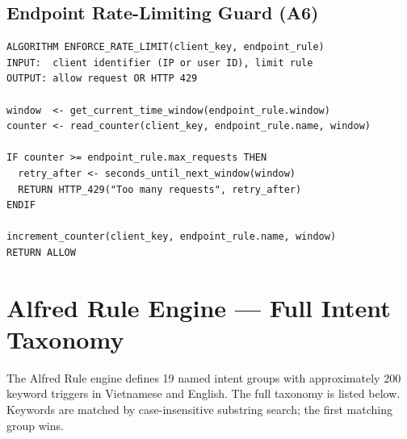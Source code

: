 \subsection{Endpoint Rate-Limiting Guard (A6)}

\begin{lstlisting}[numbers=none,caption={A6: Endpoint rate-limiting guard},label={lst:pseudo_rate_limit}]
ALGORITHM ENFORCE_RATE_LIMIT(client_key, endpoint_rule)
INPUT:  client identifier (IP or user ID), limit rule
OUTPUT: allow request OR HTTP 429

window  <- get_current_time_window(endpoint_rule.window)
counter <- read_counter(client_key, endpoint_rule.name, window)

IF counter >= endpoint_rule.max_requests THEN
  retry_after <- seconds_until_next_window(window)
  RETURN HTTP_429("Too many requests", retry_after)
ENDIF

increment_counter(client_key, endpoint_rule.name, window)
RETURN ALLOW
\end{lstlisting}

\section{Alfred Rule Engine --- Full Intent Taxonomy}
\label{app:alfred_keywords}

The Alfred Rule engine defines 19 named intent groups with approximately 200
keyword triggers in Vietnamese and English. The full taxonomy is listed
below. Keywords are matched by case-insensitive substring search;
the first matching group wins.

